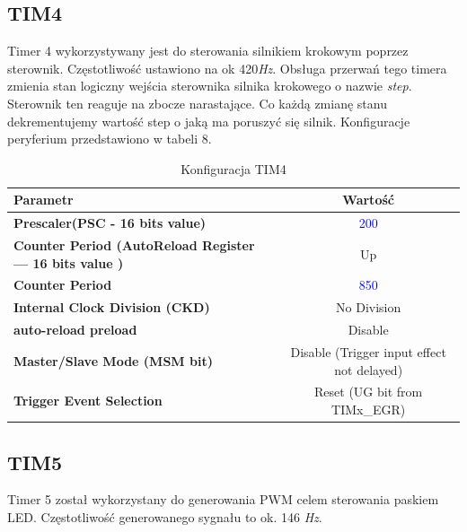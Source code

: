 \documentclass[10pt, a4paper]{article}
\begin{document}
\subsection{TIM4}
Timer 4 wykorzystywany jest do sterowania silnikiem krokowym poprzez sterownik. Częstotliwość ustawiono na ok 420\emph{Hz}. Obsługa przerwań tego timera zmienia stan logiczny wejścia sterownika silnika krokowego o nazwie \emph{step}. Sterownik ten reaguje na zbocze narastające. Co każdą zmianę stanu dekrementujemy wartość step o jaką ma poruszyć się silnik. Konfiguracje peryferium przedstawiono w tabeli 8.
 
\begin{table}[H]
    \centering
    \begin{tabular}{|l|c|} \hline
        \textbf{Parametr} & Wartość \\
        \hline
        \hline  \textbf{Prescaler(PSC - 16 bits value) }& \textcolor{blue}{200} \\
        \hline  \textbf{Counter Period (AutoReload Register --- 16 bits value )} & Up \\
        \hline  \textbf{Counter Period} & \textcolor{blue}{850} \\
        \hline  \textbf{Internal Clock Division (CKD) } & No Division\\
        \hline  \textbf{auto-reload preload} & Disable\\
        \hline  \textbf{Master/Slave Mode (MSM bit) } & Disable (Trigger input effect not delayed)
        \\
    \hline  \textbf{Trigger Event Selection} & Reset (UG bit from TIMx\_EGR)  \\
    \hline
 
    \end{tabular}
    \caption{Konfiguracja TIM4}
    \label{tab:TIM4}
\end{table}

\subsection{TIM5}
Timer 5 został wykorzystany do generowania PWM celem sterowania paskiem LED. Częstotliwość generowanego sygnału to ok. 146 \emph{Hz}.
 
\end{document}
